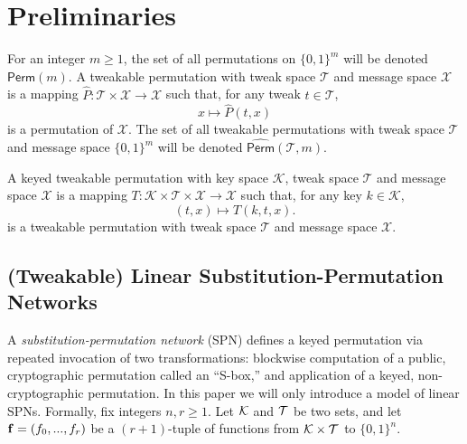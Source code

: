 

\section{Preliminaries}
\label{sec:preliminary}

For an integer $m\geq1$, the set of all permutations on $\{0, 1\}^m$ will be denoted $\textsf{Perm}(m)$. A tweakable permutation with tweak space
$\mathcal{T}$ and message space $\mathcal{X}$ is a mapping $\widehat{P}:\mathcal{T}\times\mathcal{X}\rightarrow\mathcal{X}$ such that, for any tweak
$t\in\mathcal{T}$,
%
$$x\mapsto\widehat{P}(t,x)$$
%
is a permutation of $\mathcal{X}$. The set of all tweakable permutations with tweak space
$\mathcal{T}$ and message space $\{0, 1\}^m$ will be denoted $\widehat{\textsf{Perm}}(\mathcal{T},m)$.


A keyed tweakable permutation with key space $\mathcal{K}$, tweak space $\mathcal{T}$ and message
space $\mathcal{X}$ is a mapping $T:\mathcal{K}\times\mathcal{T}\times\mathcal{X}\rightarrow\mathcal{X}$ such that, for any key $k\in\mathcal{K}$,
%
$$(t,x)\mapsto T(k,t,x).$$
%
is a tweakable permutation with tweak space $\mathcal{T}$ and message space $\mathcal{X}$.



\subsection{(Tweakable) Linear Substitution-Permutation Networks}
\label{sec:prelim-tspn}

A \emph{substitution-permutation network} (SPN) defines a keyed permutation via repeated invocation of two transformations: blockwise computation of a public, cryptographic permutation called an ``S-box,'' and application of a keyed, non-cryptographic permutation. In this paper we will only introduce a model of linear SPNs. Formally, fix integers $n,r\geq1$. Let $\mathcal{K}$ and $\mathcal{T}$ be two
sets, and let $\mathbf{f}= (f_0,...,f_r)$ be a $(r+1)$-tuple of functions from $\mathcal{K}\times\mathcal{T}$ to $\{0, 1\}^n$.





